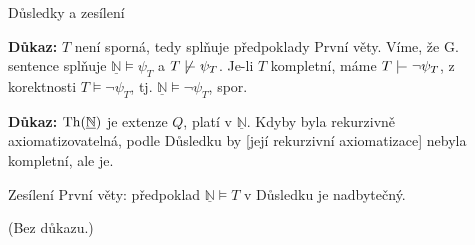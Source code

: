 \documentclass{beamer}
\begin{document}
\begin{frame}{Důsledky a zesílení}
    
    
    \textbf{Důkaz:}
        $T$ není sporná, tedy splňuje předpoklady První věty. Víme, že G. sentence splňuje $\underline{\mathbb N}\models\psi_T$ a $T\not\proves\psi_T$. Je-li $T$ kompletní, máme $T\proves\neg\psi_T$, z korektnosti $T\models\neg\psi_T$, tj. $\underline{\mathbb N}\models\neg\psi_T$, spor.
    \hfill\qedsymbol
    
    \medskip


    \textbf{Důkaz:}
    $\operatorname{Th}(\underline{\mathbb N})$ je extenze $Q$, platí v $\underline{\mathbb N}$. Kdyby byla rekurzivně axiomatizovatelná, podle Důsledku by [její rekurzivní axiomatizace] nebyla kompletní, ale je.
    \hfill\qedsymbol

    \medskip

    Zesílení První věty: předpoklad $\underline{\mathbb N}\models T$ v Důsledku je nadbytečný.


    (Bez důkazu.)

\end{frame}
\end{document}
